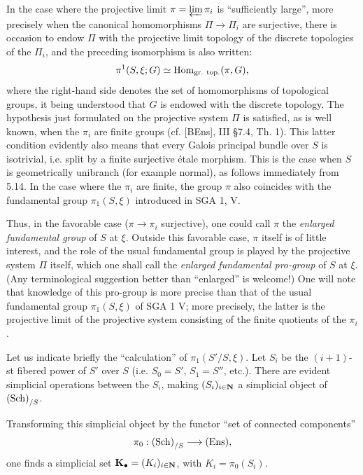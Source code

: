 In the case where the projective limit $\pi=\varprojlim\pi_i$ is ``sufficiently large'', more precisely when the canonical homomorphisms $\Pi\to\Pi_i$ are surjective, there is occasion to endow $\Pi$ with the projective limit topology of the discrete topologies of the $\Pi_i$, and the preceding isomorphism is also written:
\[
\pi^1(S,\xi;G)\simeq\Hom_{\mathrm{gr.\ top.}}(\pi,G),
\]
where the right-hand side denotes the set of homomorphisms of topological groups, it being understood that $G$ is endowed with the discrete topology.
The hypothesis just formulated on the projective system $\Pi$ is satisfied, as is well known, when the $\pi_i$ are finite groups (cf. [BEns], III \S7.4, Th. 1). This latter condition evidently also means that every Galois principal bundle over $S$ is isotrivial, i.e. split by a finite surjective étale morphism. This is the case when $S$ is geometrically unibranch (for example normal), as follows immediately from 5.14. In the case where the $\pi_i$ are finite, the group $\pi$ also coincides with the fundamental group $\pi_1(S,\xi)$ introduced in SGA 1, V.

Thus, in the favorable case ($\pi\to\pi_i$ surjective), one could call $\pi$ the \emph{enlarged fundamental group} of $S$ at $\xi$. Outside this favorable case, $\pi$ itself is of little interest, and the role of the usual fundamental group is played by the projective system $\Pi$ itself, which one shall call the \emph{enlarged fundamental pro-group} of $S$ at $\xi$. (Any terminological suggestion better than ``enlarged'' is welcome!) One will note that knowledge of this pro-group is more precise than that of the usual fundamental group $\pi_1(S,\xi)$ of SGA 1 V; more precisely, the latter is the projective limit of the projective system consisting of the finite quotients of the $\pi_i$.

Let us indicate briefly the ``calculation'' of $\pi_1(S'/S,\xi)$. Let $S_i$ be the $(i+1)$-st fibered power of $S'$ over $S$ (i.e. $S_0=S'$, $S_1=S''$, etc.). There are evident simplicial operations between the $S_i$, making $(S_i)_{i\in\mathbf{N}}$ a simplicial object of $\textup{(Sch)}_{/S}$.

Transforming this simplicial object by the functor ``set of connected components''
\[
\pi_0:\textup{(Sch)}_{/S}\longrightarrow\textup{(Ens)},
\]
one finds a simplicial set $\mathbf K_\bullet=(K_i)_{i\in\mathbf{N}}$, with $K_i=\pi_0(S_i)$.

